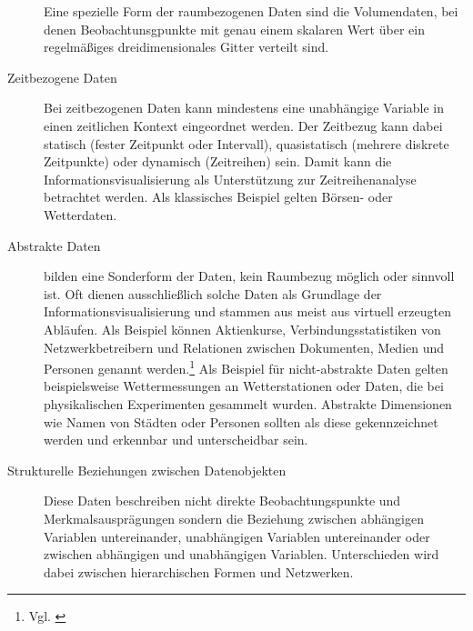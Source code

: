 \documentclass[a4paper, 12pt, DIVcalc, onepage, pdftex, headsepline, footsepline]{scrreprt}
\begin{document}
\begin{description}
Eine spezielle Form der raumbezogenen Daten sind die Volumendaten, bei denen Beobachtunsgpunkte mit
genau einem skalaren Wert über ein regelmäßiges dreidimensionales Gitter verteilt sind.
\item[Zeitbezogene Daten]
Bei zeitbezogenen Daten kann mindestens eine unabhängige Variable in einen zeitlichen Kontext eingeordnet werden.
Der Zeitbezug kann dabei statisch (fester Zeitpunkt oder Intervall), quasistatisch (mehrere diskrete Zeitpunkte)
oder dynamisch (Zeitreihen) sein. Damit kann die Informationsvisualisierung als Unterstützung zur
Zeitreihenanalyse betrachtet werden.
Als klassisches Beispiel gelten Börsen- oder Wetterdaten.
\item[Abstrakte Daten]
bilden eine Sonderform der Daten, kein Raumbezug möglich oder sinnvoll ist. Oft dienen
ausschließlich solche Daten als Grundlage der Informationsvisualisierung und stammen aus meist aus virtuell
erzeugten Abläufen.
Als Beispiel können Aktienkurse, Verbindungsstatistiken von Netzwerkbetreibern und Relationen zwischen
Dokumenten, Medien und Personen genannt werden.\footnote{Vgl. \citep{Preim}} Als Beispiel für nicht-abstrakte
Daten gelten beispielsweise Wettermessungen an Wetterstationen oder Daten, die bei physikalischen Experimenten
gesammelt wurden. Abstrakte Dimensionen wie Namen von Städten oder Personen sollten als diese gekennzeichnet
werden und erkennbar und unterscheidbar sein.
\item[Strukturelle Beziehungen zwischen Datenobjekten]
Diese Daten beschreiben nicht direkte Beobachtungspunkte und Merkmalsausprägungen sondern die Beziehung zwischen
abhängigen Variablen untereinander, unabhängigen Variablen untereinander oder zwischen abhängigen und unabhängigen
Variablen.
Unterschieden wird dabei zwischen hierarchischen Formen und Netzwerken. 
\end{description}
\end{document}
